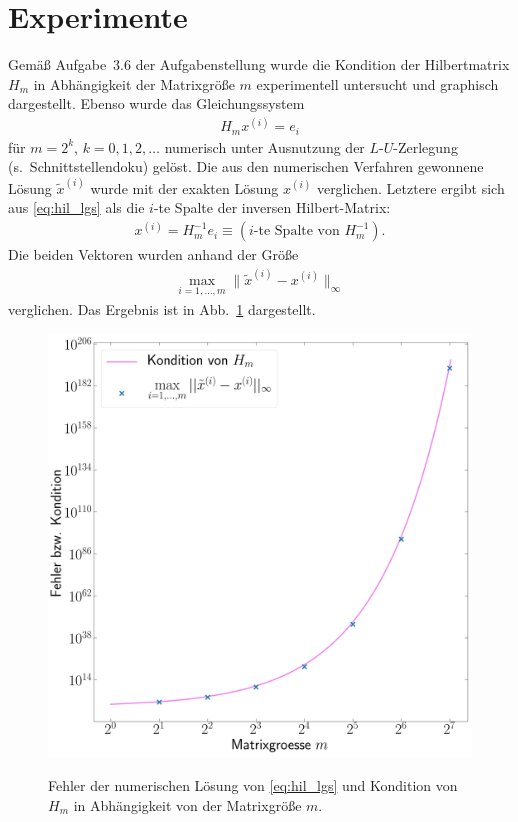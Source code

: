 \documentclass[smallheadings]{scrartcl}
\numberwithin{equation}{section}
\begin{document}
\section{Experimente}

Gemäß Aufgabe~3.6 der Aufgabenstellung wurde die Kondition der Hilbertmatrix $H_m$ in Abhängigkeit der Matrixgröße $m$ experimentell untersucht und graphisch dargestellt. Ebenso wurde das Gleichungssystem 
\begin{align}
H_mx^{(i)}=e_i
\label{eq:hil_lgs}
\end{align}
für $m=2^k$, $k=0,1,2,\dots$ numerisch unter Ausnutzung der $L$-$U$-Zerlegung (s.~Schnittstellendoku) gelöst. Die aus den numerischen Verfahren gewonnene Lösung $\tilde{x}^{(i)}$ wurde mit der exakten Lösung $x^{(i)}$ verglichen. Letztere ergibt sich aus \eqref{eq:hil_lgs} als die $i$-te Spalte der inversen Hilbert-Matrix:
\begin{align}
x^{(i)}=H_m^{-1}e_i\equiv(\text{$i$-te Spalte von }H_m^{-1}).
\end{align}
Die beiden Vektoren wurden anhand der Größe
\begin{align*}
\max\limits_{i=1,\dots,m}\|\tilde{x}^{(i)}-x^{(i)}\|_\infty
\end{align*}
verglichen. Das Ergebnis ist in Abb.~\ref{fig:hil_kond_fehl}
dargestellt.

\begin{figure}[H]
\centering
\includegraphics[width=.8\textwidth]{Bericht/Bilder/hil_kond_fehl}
\label{fig:hil_kond_fehl}
\caption{Fehler der numerischen Lösung von \eqref{eq:hil_lgs} und Kondition von $H_m$ in Abhängigkeit von der Matrixgröße $m$.}
\end{figure}
\end{document}
